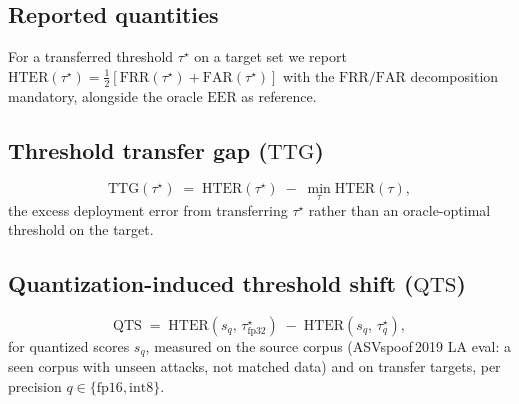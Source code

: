 \documentclass[journal]{IEEEtran}
\newcommand{\ttg}{\mathrm{TTG}}
\newcommand{\qts}{\mathrm{QTS}}
\newcommand{\hter}{\mathrm{HTER}}
\newcommand{\frr}{\mathrm{FRR}}
\newcommand{\far}{\mathrm{FAR}}
\newcommand{\eer}{\mathrm{EER}}
\newcommand{\taustar}{\tau^{\star}}
\begin{document}
\subsection{Reported quantities}
For a transferred threshold \(\taustar\) on a target set we report
\(\hter(\taustar)=\tfrac12[\frr(\taustar)+\far(\taustar)]\) with the
\(\frr/\far\) decomposition mandatory, alongside the oracle \(\eer\) as
reference.

\subsection{Threshold transfer gap (\(\ttg\))}
\begin{equation}
\ttg(\taustar) \;=\; \hter(\taustar) \;-\; \min_{\tau}\hter(\tau),
\label{eq:ttg}
\end{equation}
the excess deployment error from transferring \(\taustar\) rather than an
oracle-optimal threshold on the target.%

\subsection{Quantization-induced threshold shift (\(\qts\))}
\begin{equation}
\qts \;=\; \hter\!\left(s_{q},\,\taustar_{\text{fp32}}\right)
        \;-\; \hter\!\left(s_{q},\,\taustar_{q}\right),
\label{eq:qts}
\end{equation}
for quantized scores \(s_q\), measured on the source corpus (ASVspoof\,2019 LA
eval: a seen corpus with unseen attacks, not matched data) and on transfer targets, per
precision \(q\in\{\text{fp16},\text{int8}\}\).
\end{document}
